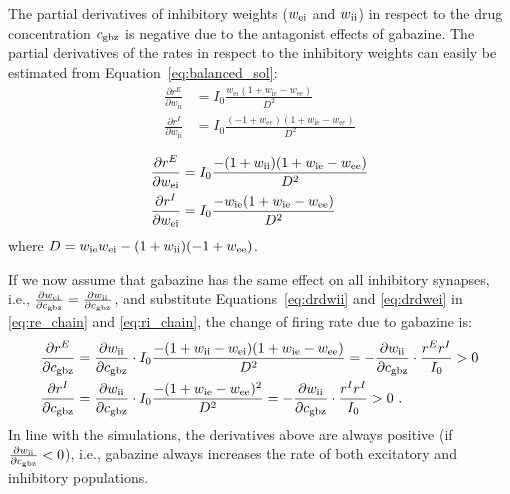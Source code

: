     The partial derivatives of inhibitory weights ($w_{\rm ei}$ and $w_{\rm
    ii}$) in respect to the drug concentration $c_{\rm gbz}$ is negative due to
    the antagonist  effects of gabazine. The partial derivatives of the rates
    in respect to the inhibitory weights can easily be estimated from
    Equation~\ref{eq:balanced_sol}:
    \begin{equation}
      \begin{split}
        \frac{\partial r^E}{\partial w_{\mathrm ii}} &= 
              I_0 \frac{w_{\mathrm ei} (1 + w_{\mathrm ie} - w_{\mathrm ee})} {D^2} \\
        \frac{\partial r^I}{\partial w_{\mathrm ii}} &=
              I_0 \frac{(-1 + w_{\mathrm ee})(1 + w_{\mathrm ie} - w_{\mathrm ee})} {D^2}
      \end{split}
      \label{eq:drdwii}
    \end{equation}

    \begin{equation}
      \begin{split}
        \frac{\partial r^E}{\partial w_{\rm ei}} &=
              I_0 \frac{-(1 + w_{\rm ii}) (1 + w_{\rm ie} - w_{\rm ee})} {D^2} \\
        \frac{\partial r^I}{\partial w_{\rm ei}} &=
              I_0 \frac{-w_{\rm ie} (1 + w_{\rm ie} - w_{\rm ee})} {D^2}
      \end{split}
      \label{eq:drdwei}
    \end{equation}
    where $D=w_{\rm ie}w_{\rm ei} - (1+w_{\rm ii})(-1+w_{\rm ee})$.
    
    If we now assume that gabazine has the same effect on all inhibitory
    synapses, i.e., $\frac{\partial w_{\rm ei}}{\partial c_{\rm gbz}} =
    \frac{\partial w_{\rm ii}}{\partial c_{\rm gbz}}$, and substitute
    Equations~\ref{eq:drdwii} and \ref{eq:drdwei} in \ref{eq:re_chain} and
    \ref{eq:ri_chain}, the change of firing rate due to gabazine is:
    \begin{equation}
      \begin{split}
        \frac{\partial r^E}{\partial c_{\rm gbz}} &=
            \frac{\partial w_{\rm ii}}{\partial c_{\rm gbz}} \cdot
            I_0 \frac{-(1 + w_{\rm ii} - w_{\rm ei}) (1 + w_{\rm ie} - w_{\rm ee})} {D^2} =
            - \frac{\partial w_{\rm ii}}{\partial c_{\rm gbz}} \cdot \frac{r^E r^I}{I_0} > 0 \\
        \frac{\partial r^I}{\partial c_{\rm gbz}} &=
            \frac{\partial w_{\rm ii}}{\partial c_{\rm gbz}} \cdot
            I_0 \frac{- (1 + w_{\rm ie} - w_{\rm ee})^2} {D^2} =
            - \frac{\partial w_{\rm ii}}{\partial c_{\rm gbz}} \cdot \frac{r^I r^I}{I_0} > 0 \,\,. \\
      \end{split}
    \end{equation}
    In line with the simulations, the derivatives above are always positive (if
    $\frac{\partial w_{\rm ii}}{\partial c_{\rm gbz}} < 0 $), i.e., gabazine
    always increases the rate of both excitatory and inhibitory
    populations. 

